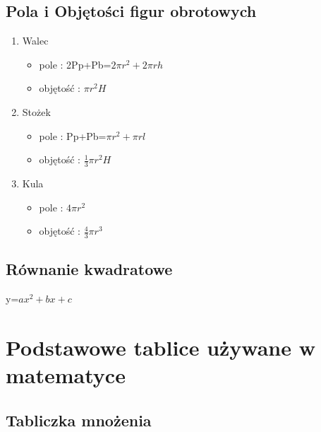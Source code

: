 \documentclass[a4paper]{article}
\begin{document}
\subsection{Pola i Objętości figur obrotowych}
\begin{enumerate}
	\item Walec
		\begin{itemize}
			\item pole : 2Pp+Pb=$2\pi r^{2}+2\pi rh$ 
			\item objętość : $\pi r^{2}H$ 
		\end{itemize}
	\item Stożek
		\begin{itemize}
			\item pole : Pp+Pb=$\pi r^{2}+\pi rl$ 
			\item objętość : $\frac{1}{3}\pi r^{2}H$ 
		\end{itemize} 			
	\item Kula
		\begin{itemize}
			\item pole : $4\pi r^{2}$ 
			\item objętość :  $\frac{4}{3}\pi r^{3}$ 
		\end{itemize}
\end{enumerate}
\subsection{Równanie kwadratowe}
y=$ax^{2}+bx+c$
\label{wzór}












\section{Podstawowe tablice używane w matematyce}
	

	\subsection{Tabliczka mnożenia}	
\end{document}
